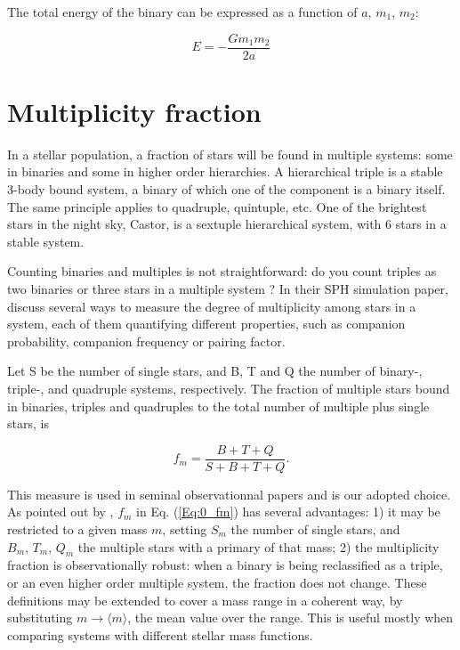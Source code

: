 The total energy of the binary can be expressed as a function of $a$, $m_1$, $m_2$:

\begin{equation}
E = - \frac{G m_1 m_2}{2a} 
\end{equation}



\section{Multiplicity fraction}

In a stellar population, a fraction of stars will be found in multiple systems: some  in binaries and some in higher order hierarchies. A hierarchical triple is a stable 3-body bound system, a binary of which one of the component is a binary itself. The same principle applies to quadruple, quintuple, etc. One of the brightest stars in the night sky, Castor, is a sextuple hierarchical system, with 6 stars in a stable system.

Counting binaries and multiples is not straightforward: do you count triples as two binaries or three stars in a multiple system ? In their SPH simulation paper, \cite{Goodwin2004a} discuss several ways to measure the degree of multiplicity among stars in a system, each of them quantifying different properties, such as companion probability, companion frequency or pairing factor. 

Let  S be the number of single stars, and B, T and Q the number of binary-, triple-, and quadruple systems, respectively. The fraction of multiple stars bound in binaries, triples and quadruples to the total number of multiple plus single stars, is

\begin{equation}
\label{Eq:0_fm} 
f_m = \frac{B + T + Q}{S + B + T + Q}. 
\end{equation}

This measure is used in seminal observationnal papers \citep{DM91,Raghavan2010} and is our adopted choice. As pointed out by \cite{Hubber2005}, $f_m$ in Eq. (\ref{Eq:0_fm}) has several advantages: 1) it  may be  restricted to a given mass $m$, setting  $S_m$ the number of single stars, and $B_m,\, T_m,\, Q_m$  the multiple stars with a primary of that mass;  2)  the multiplicity fraction is observationally robust: when a binary is being reclassified as a triple, or an even higher order multiple system, the fraction does not change. 
 These definitions may be extended to cover a mass range  in a coherent way, by substituting $m \rightarrow \langle m\rangle$, the mean value over the range. This is useful mostly when comparing  systems with different stellar mass functions. 


